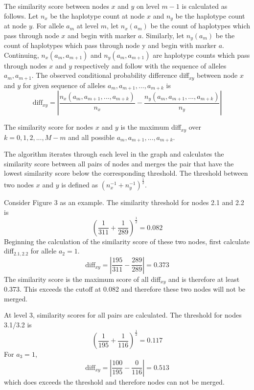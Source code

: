 \documentclass[a4paper,12pt,twoside,abstraction,titlepage]{article}
\begin{document}
The similarity score between nodes $x$ and $y$ on level $m-1$ is calculated as follows.  Let $n_x$ be the haplotype count at node $x$ and $n_y$ be the haplotype count at node $y$.  For allele $a_m$ at level $m$, let $n_x(a_m)$ be the count of haplotypes which pass through node $x$ and begin with marker $a$.  Similarly, let $n_y(a_m)$ be the count of haplotypes which pass through node y and begin with marker $a$.  Continuing, $n_x(a_m,a_{m+1})$ and $n_y(a_m,a_{m+1})$ are haplotype counts which pass through nodes $x$ and $y$ respectively and follow with the sequence of alleles $a_m,a_{m+1}$.  The observed conditional probability difference diff$_{xy}$ between node $x$ and $y$ for given sequence of alleles $a_m,a_{m+1},...,a_{m+k}$ is
\begin{equation*}
\mbox{diff}_{xy} = \left|\frac{n_x(a_m,a_{m+1},...,a_{m+k})}{n_x} - \frac{n_y(a_m,a_{m+1},...,a_{m+k})}{n_y}\right|
\end{equation*}


\noindent The similarity score for nodes $x$ and $y$ is the maximum diff$_{xy}$ over $k=0, 1, 2,..., M-m$ and all possible $a_m,a_{m+1},...,a_{m+k}$.

The algorithm iterates through each level in the graph and calculates the similarity score between all pairs of nodes and merges the pair that have the lowest similarity score below the corresponding threshold.  The threshold between two nodes $x$ and $y$ is defined as $(n_x^{-1} + n_y^{-1})^{\frac{1}{2}}$.

Consider Figure 3 as an example.   The similarity threshold for nodes 2.1 and 2.2 is 
\vspace{-5pt}
\begin{equation*}
\left(\frac{1}{311}+\frac{1}{289}\right)^{\frac{1}{2}} = 0.082
\end{equation*}
Beginning the calculation of the similarity score of these two nodes, first calculate diff$_{2.1,2.2}$ for allele $a_2=1$.
\begin{equation*}
\mbox{diff}_{xy} = \left|\frac{195}{311}-\frac{289}{289}\right| = 0.373
\end{equation*}
The similarity score is the maximum score of all diff$_{xy}$ and is therefore at least 0.373.  This exceeds the cutoff at 0.082 and therefore these two nodes will not be merged.

At level 3, similarity scores for all pairs are calculated.  The threshold for nodes 3.1/3.2 is 
\vspace{-5pt}
\begin{equation*}
\left(\frac{1}{195}+\frac{1}{116}\right)^{\frac{1}{2}} = 0.117
\end{equation*}
For $a_3=1$,
\begin{equation*}
\mbox{diff}_{xy} = \left|\frac{100}{195}-\frac{0}{116}\right| = 0.513
\end{equation*}
which does exceeds the threshold and therefore nodes can not be merged.
\end{document}
